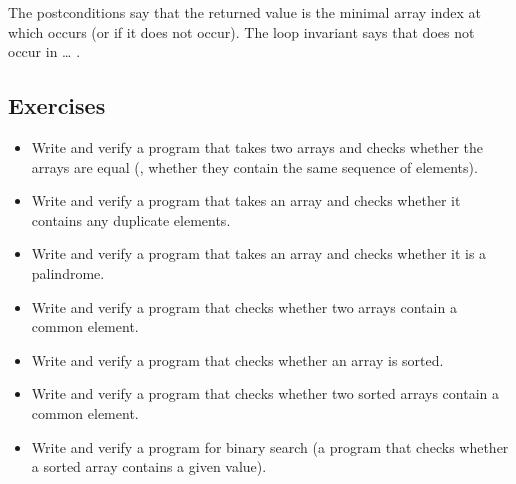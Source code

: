 \noindent
The postconditions say that the returned value is the minimal array
index at which  occurs (or  if it does not occur).
The loop invariant says that   does not occur in \dots
{}.

\subsection*{Exercises}
\begin{itemize}
\item
Write and verify a program that takes two arrays and checks whether
the arrays are equal (\ie, whether they contain the same sequence of
elements).
\item
Write and verify a program that takes an array and checks whether it
contains any duplicate elements.
\item
Write and verify a program that takes an array and checks whether it
is a palindrome.
\item
Write and verify a program that checks whether two arrays contain a
common element.
\item
Write and verify a program that checks whether an array is sorted.
\item
Write and verify a program that checks whether two sorted arrays
contain a common element.
\item
Write and verify a program for binary search (a program
that checks whether a sorted array contains a given value).
\end{itemize}

%

